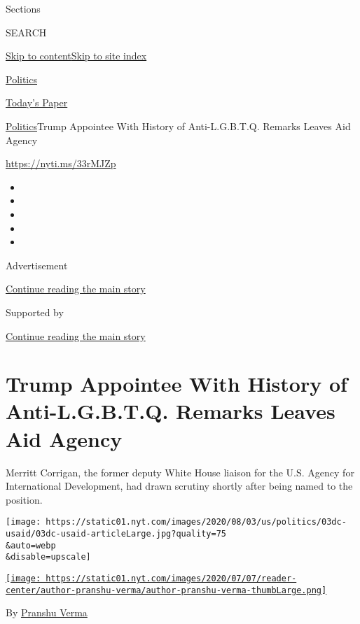 Sections

SEARCH

\protect\hyperlink{site-content}{Skip to
content}\protect\hyperlink{site-index}{Skip to site index}

\href{https://www.nytimes.com/section/politics}{Politics}

\href{https://myaccount.nytimes.com/auth/login?response_type=cookie\&client_id=vi}{}

\href{https://www.nytimes.com/section/todayspaper}{Today's Paper}

\href{/section/politics}{Politics}\textbar{}Trump Appointee With History
of Anti-L.G.B.T.Q. Remarks Leaves Aid Agency

\url{https://nyti.ms/33rMJZp}

\begin{itemize}
\item
\item
\item
\item
\item
\end{itemize}

Advertisement

\protect\hyperlink{after-top}{Continue reading the main story}

Supported by

\protect\hyperlink{after-sponsor}{Continue reading the main story}

\hypertarget{trump-appointee-with-history-of-anti-lgbtq-remarks-leaves-aid-agency}{%
\section{Trump Appointee With History of Anti-L.G.B.T.Q. Remarks Leaves
Aid
Agency}\label{trump-appointee-with-history-of-anti-lgbtq-remarks-leaves-aid-agency}}

Merritt Corrigan, the former deputy White House liaison for the U.S.
Agency for International Development, had drawn scrutiny shortly after
being named to the position.

\texttt{[image: https://static01.nyt.com/images/2020/08/03/us/politics/03dc-usaid/03dc-usaid-articleLarge.jpg?quality=75\\\&auto=webp\\\&disable=upscale]}

\href{https://www.nytimes.com/by/pranshu-verma}{\texttt{[image: https://static01.nyt.com/images/2020/07/07/reader-center/author-pranshu-verma/author-pranshu-verma-thumbLarge.png]}}

By \href{https://www.nytimes.com/by/pranshu-verma}{Pranshu Verma}

